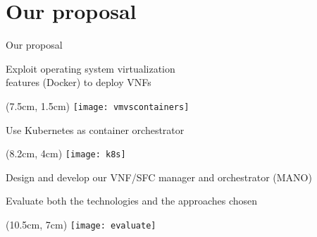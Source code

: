 \section{Our proposal}

\begin{frame}{Our proposal}

  \vspace*{1cm}

  Exploit operating system virtualization\\ features (Docker) to deploy VNFs

  \begin{textblock*}{1cm}(7.5cm, 1.5cm)
    \texttt{[image: vmvscontainers]}
  \end{textblock*}


  \vspace{1.2cm}

  Use Kubernetes as container orchestrator

  \vspace{1cm}

  \begin{textblock*}{1cm}(8.2cm, 4cm)
    \texttt{[image: k8s]}
  \end{textblock*}

  Design and develop our VNF/SFC manager and orchestrator (MANO)

  \vspace{0.8cm}

  Evaluate both the technologies and the approaches chosen

  \vspace{1cm}

  \begin{textblock*}{1cm}(10.5cm, 7cm)
    \texttt{[image: evaluate]}
  \end{textblock*}

\end{frame}